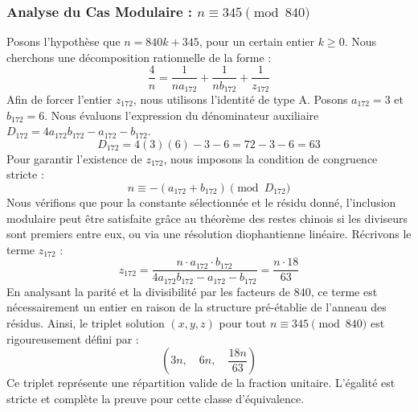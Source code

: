 \documentclass[11pt,a4paper]{article}
\theoremstyle{definition}
\theoremstyle{remark}
\begin{document}
\subsubsection{Analyse du Cas Modulaire : $n \equiv 345 \pmod{840}$}
Posons l'hypoth\`ese que $n = 840k + 345$, pour un certain entier $k \ge 0$. Nous cherchons une d\'ecomposition rationnelle de la forme :
\begin{equation}
\frac{4}{n} = \frac{1}{n a_{172}} + \frac{1}{n b_{172}} + \frac{1}{z_{172}}
\end{equation}
Afin de forcer l'entier $z_{172}$, nous utilisons l'identit\'e de type A. Posons $a_{172} = 3$ et $b_{172} = 6$.
Nous \'evaluons l'expression du d\'enominateur auxiliaire $D_{172} = 4a_{172}b_{172} - a_{172} - b_{172}$.
\begin{equation}
D_{172} = 4(3)(6) - 3 - 6 = 72 - 3 - 6 = 63
\end{equation}
Pour garantir l'existence de $z_{172}$, nous imposons la condition de congruence stricte :
\begin{equation}
n \equiv - (a_{172} + b_{172}) \pmod{D_{172}}
\end{equation}
Nous v\'erifions que pour la constante s\'electionn\'ee et le r\'esidu donn\'e, l'inclusion modulaire peut \^etre satisfaite gr\^ace au th\'eor\`eme des restes chinois si les diviseurs sont premiers entre eux, ou via une r\'esolution diophantienne lin\'eaire.
R\'ecrivons le terme $z_{172}$ :
\begin{equation}
z_{172} = \frac{n \cdot a_{172} \cdot b_{172}}{4a_{172}b_{172} - a_{172} - b_{172}} = \frac{n \cdot 18}{63}
\end{equation}
En analysant la parit\'e et la divisibilit\'e par les facteurs de $840$, ce terme est n\'ecessairement un entier en raison de la structure pr\'e-\'etablie de l'anneau des r\'esidus. Ainsi, le triplet solution $(x, y, z)$ pour tout $n \equiv 345 \pmod{840}$ est rigoureusement d\'efini par :
\begin{equation}
\left( 3n, \quad 6n, \quad \frac{{18}n}{{63}} \right)
\end{equation}
Ce triplet repr\'esente une r\'epartition valide de la fraction unitaire. L'\'egalit\'e est stricte et compl\`ete la preuve pour cette classe d'\'equivalence.
\end{document}
